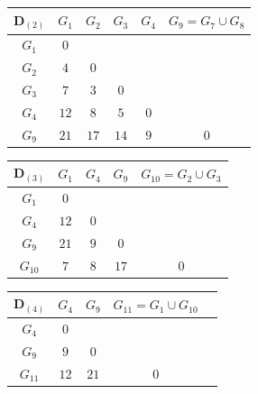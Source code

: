 \begin{enumerate}
\begin{enumerate}[label=(\arabic*)]
\begin{table}[H]
\begin{tabular}{|c|c|c|c|c|c|c|}
                \end{tabular}
            \end{table}
            \begin{table}[H]
                \centering
                \begin{tabular}{|c|c|c|c|c|c|}
                    \hline
                    $\pmb{D}_{(2)}$ & $G_1$ & $G_2$ & $G_3$ & $G_4$ & $G_9=G_7 \cup G_8$ \\ \hline
                    $G_1$ & $0$ & & & & \\ \hline
                    $G_2$ & $4$ & $0$ & & & \\ \hline
                    $G_3$ & $7$ & $\textit{3}$ & $0$ & & \\ \hline
                    $G_4$ & $12$ & $8$ & $5$ & $0$ & \\ \hline
                    $G_9$ & $21$ & $17$ & $14$ & $9$ & $0$ \\ \hline
                \end{tabular}
            \end{table}
            \begin{table}[H]
                \centering
                \begin{tabular}{|c|c|c|c|c|}
                    \hline
                    $\pmb{D}_{(3)}$ & $G_1$ & $G_4$ & $G_9$ & $G_{10}=G_2 \cup G_3$ \\ \hline
                    $G_1$ & $0$ & & & \\ \hline
                    $G_4$ & $12$ & $0$ & & \\ \hline
                    $G_9$ & $21$ & $9$ & $0$ & \\ \hline
                    $G_{10}$ & $\textit{7}$ & $8$ & $17$ & $0$ \\ \hline
                \end{tabular}
            \end{table}
            \begin{table}[H]
                \centering
                \begin{tabular}{|c|c|c|c|c|}
                    \hline
                    $\pmb{D}_{(4)}$ & $G_4$ & $G_9$ & $G_{11}=G_1 \cup G_{10}$ \\ \hline
                    $G_4$ & $0$ & & \\ \hline
                    $G_9$ & $\textit{9}$ & $0$ & \\ \hline
                    $G_{11}$ & $12$ & $21$ & $0$ \\ \hline

\end{tabular}
\end{table}
\end{enumerate}
\end{enumerate}

